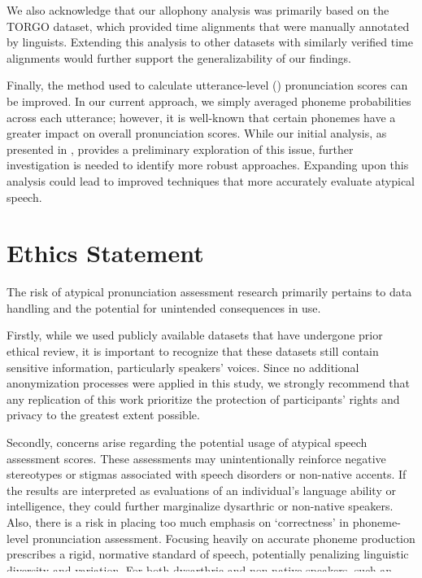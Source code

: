 We also acknowledge that our allophony analysis was primarily based on the TORGO dataset, which provided time alignments that were manually annotated by linguists. 
Extending this analysis to other datasets with similarly verified time alignments would further support the generalizability of our findings.

Finally, the method used to calculate utterance-level () pronunciation scores can be improved. 
In our current approach, we simply averaged phoneme probabilities across each utterance; however, it is well-known that certain phonemes have a greater impact on overall pronunciation scores. 
While our initial analysis, as presented in ,  provides a preliminary exploration of this issue, further investigation is needed to identify more robust approaches.
Expanding upon this analysis could lead to improved techniques that more accurately evaluate atypical speech.




\section*{Ethics Statement}
The risk of atypical pronunciation assessment research primarily pertains to data handling and the potential for unintended consequences in use.


Firstly, while we used publicly available datasets that have undergone prior ethical review, it is important to recognize that these datasets still contain sensitive information, particularly speakers’ voices. 
Since no additional anonymization processes were applied in this study, we strongly recommend that any replication of this work prioritize the protection of participants’ rights and privacy to the greatest extent possible.

Secondly, concerns arise regarding the potential usage of atypical speech assessment scores. 
These assessments may unintentionally reinforce negative stereotypes or stigmas associated with speech disorders or non-native accents. 
If the results are interpreted as evaluations of an individual’s language ability or intelligence, they could further marginalize dysarthric or non-native speakers.
Also, there is a risk in placing too much emphasis on `correctness' in phoneme-level pronunciation assessment. 
Focusing heavily on accurate phoneme production prescribes a rigid, normative standard of speech, potentially penalizing linguistic diversity and variation. 
For both dysarthric and non-native speakers, such an emphasis might overshadow more functional measures of communication success, which may be more meaningful in real-world contexts.
Despite these concerns, which warrant careful consideration, we want to emphasize that our work is intended to have a significant positive impact from an ethical perspective.


